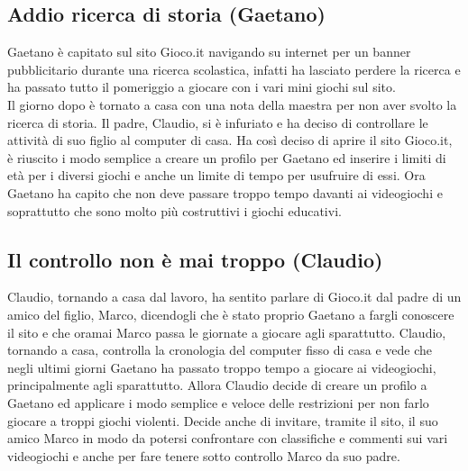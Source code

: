 \documentclass[../Report.tex]{subfiles}
\begin{document}
    \subsection{Addio ricerca di storia (Gaetano)}
    Gaetano è capitato sul sito Gioco.it navigando su internet per un banner pubblicitario durante una ricerca scolastica, infatti ha lasciato perdere la ricerca e ha passato tutto il pomeriggio a giocare con i vari mini giochi sul sito.\\
    Il giorno dopo è tornato a casa con una nota della maestra per non aver svolto la ricerca di storia. Il padre, Claudio, si è infuriato e ha deciso di controllare le attività di suo figlio al computer di casa. Ha così deciso di aprire il sito Gioco.it, è riuscito i modo semplice a creare un profilo per Gaetano ed inserire i limiti di età per i diversi giochi e anche un limite di tempo per usufruire di essi. Ora Gaetano ha capito che non deve passare troppo tempo davanti ai videogiochi e soprattutto che sono molto più costruttivi i giochi educativi.

    \subsection{Il controllo non è mai troppo (Claudio)}
    Claudio, tornando a casa dal lavoro, ha sentito parlare di Gioco.it dal padre di un amico del figlio, Marco, dicendogli che è stato proprio Gaetano a fargli conoscere il sito e che oramai Marco passa le giornate a giocare agli sparattutto. Claudio, tornando a casa, controlla la cronologia del computer fisso di casa e vede che negli ultimi giorni Gaetano ha passato troppo tempo a giocare ai videogiochi, principalmente agli sparattutto. Allora Claudio decide di creare un profilo a Gaetano ed applicare i modo semplice e veloce delle restrizioni per non farlo giocare a troppi giochi violenti. Decide anche di invitare, tramite il sito, il suo amico Marco in modo da potersi confrontare con classifiche e commenti sui vari videogiochi e anche per fare tenere sotto controllo Marco da suo padre.
\end{document}
